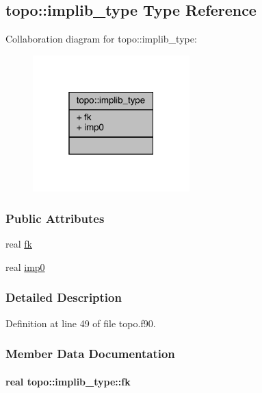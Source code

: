 \hypertarget{structtopo_1_1implib__type}{\subsection{topo\-:\-:implib\-\_\-type Type Reference}
\label{structtopo_1_1implib__type}
}


Collaboration diagram for topo\-:\-:implib\-\_\-type\-:
\nopagebreak
\begin{figure}[H]
\begin{center}
\leavevmode
\includegraphics[width=172pt]{structtopo_1_1implib__type__coll__graph}
\end{center}
\end{figure}
\subsubsection*{Public Attributes}
\begin{DoxyCompactItemize}
\item 
real \hyperlink{structtopo_1_1implib__type_abb3199aa4ec66c07e689419a10aecc8a}{fk}
\item 
real \hyperlink{structtopo_1_1implib__type_a782ce248f6ec9d36b585494a68533484}{imp0}
\end{DoxyCompactItemize}


\subsubsection{Detailed Description}


Definition at line 49 of file topo.\-f90.



\subsubsection{Member Data Documentation}
\hypertarget{structtopo_1_1implib__type_abb3199aa4ec66c07e689419a10aecc8a}{
\paragraph[{fk}]{\setlength{\rightskip}{0pt plus 5cm}real topo\-::implib\-\_\-type\-::fk}}\label{structtopo_1_1implib__type_abb3199aa4ec66c07e689419a10aecc8a}


